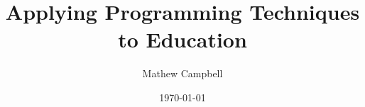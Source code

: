 \documentclass[a4paper]{report}
\title{Applying Programming Techniques to Education}
\subtitle{}%
\author{Mathew Campbell}
\date{\today}
\begin{document}
  \makeTYPTitle

  

  \tableofcontents

  
  
  
  
  
  
  

  

  
\end{document}

